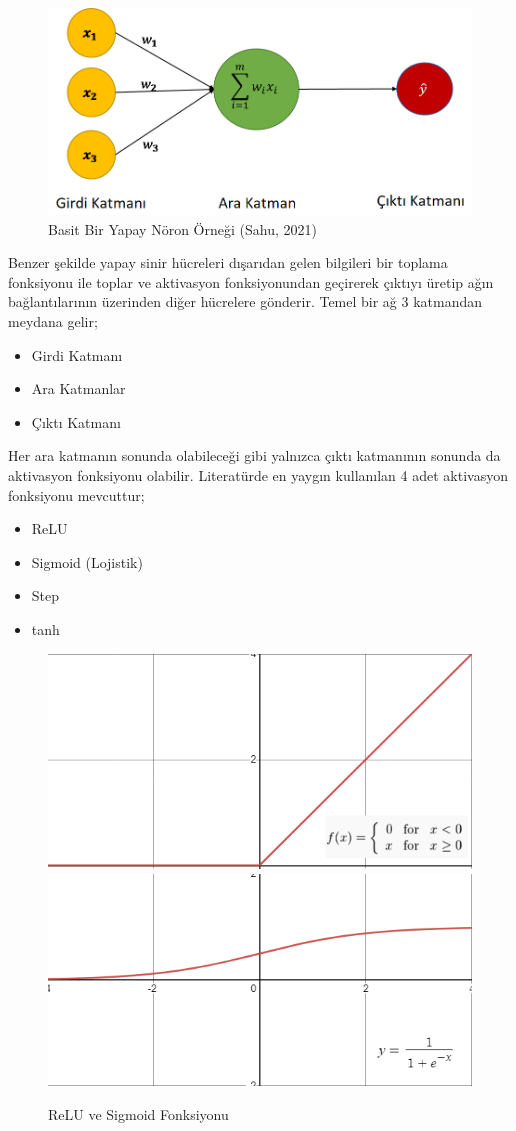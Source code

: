 \documentclass[12pt,twoside]{deuthesis}
\begin{document}
\begin{figure}

{\centering \includegraphics[width=1\linewidth,height=0.4\textheight]{figure/basic_neuron} 

}

\caption{Basit Bir Yapay Nöron Örneği (Sahu, 2021)}\label{fig:unnamed-chunk-8}
\end{figure}
Benzer şekilde yapay sinir hücreleri dışarıdan gelen bilgileri bir toplama fonksiyonu ile toplar ve aktivasyon fonksiyonundan geçirerek çıktıyı üretip ağın bağlantılarının üzerinden diğer hücrelere gönderir. Temel bir ağ 3 katmandan meydana gelir;
\begin{itemize}
\item
  Girdi Katmanı
\item
  Ara Katmanlar
\item
  Çıktı Katmanı
\end{itemize}
Her ara katmanın sonunda olabileceği gibi yalnızca çıktı katmanının sonunda da aktivasyon fonksiyonu olabilir. Literatürde en yaygın kullanılan 4 adet aktivasyon fonksiyonu mevcuttur;
\begin{itemize}
\item
  ReLU
\item
  Sigmoid (Lojistik)
\item
  Step
\item
  tanh
\end{itemize}
\begin{figure}

{\centering \includegraphics[width=0.49\linewidth,height=0.18\textheight]{figure/relu} \includegraphics[width=0.49\linewidth,height=0.18\textheight]{figure/sigmoid} 

}

\caption{ReLU ve Sigmoid Fonksiyonu}\label{fig:unnamed-chunk-9}
\end{figure}
\end{document}
